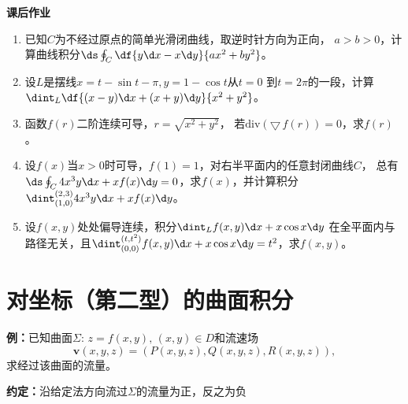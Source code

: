 \begin{ext}
	{\bf 课后作业}
	\begin{enumerate}
	  \item 已知$C$为不经过原点的简单光滑闭曲线，取逆时针方向为正向，
	  $a>b>0$，计算曲线积分$\ds\oint_C\df{y\d x-x\d y}{ax^2+by^2}$。
	  \item 设$L$是摆线$x=t-\sin t-\pi,y=1-\cos t$从$t=0$
	  到$t=2\pi$的一段，计算$\dint_L\df{(x-y)\d x+(x+y)\d y}{x^2+y^2}$。
	  \item 函数$f(r)$二阶连续可导，$r=\sqrt{x^2+y^2}$，
  	  若$\mathrm{div}(\bigtriangledown\,f(r))=0$，求$f(r)$。
  	  \item 设$f(x)$当$x>0$时可导，$f(1)=1$，对右半平面内的任意封闭曲线$C$，
	  总有$\ds\oint_C4x^3y\d x+xf(x)\d y=0$，求$f(x)$，并计算积分
	  $\dint_{(1,0)}^{(2,3)}4x^3y\d x+xf(x)\d y$。
	  \item 设$f(x,y)$处处偏导连续，积分$\dint_Lf(x,y)\d x+x\cos x\d y$
	  在全平面内与路径无关，且$\dint_{(0,0)}^{(t,t^2)}f(x,y)\d x+x\cos x\d y
	  =t^2$，求$f(x,y)$。
	\end{enumerate}
\end{ext}

\section{对坐标（第二型）的曲面积分}

{\bf 例：}已知曲面$\Sigma:\,z=f(x,y),\,(x,y)\in D$和流速场
$$\bm{v}(x,y,z)=(P(x,y,z),Q(x,y,z),R(x,y,z)),$$
求经过该曲面的流量。

{\bf 约定：}沿给定法方向流过$\Sigma$的流量为正，反之为负

